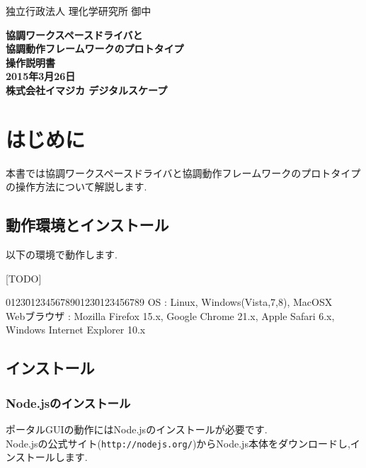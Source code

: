 \documentclass[a4paper,10pt,oneside]{jsbook}
\begin{document}
\begin{titlepage}
\noindent
独立行政法人 理化学研究所 御中
\begin{center}
	\vspace{8cm}
	{\Huge \textbf{協調ワークスペースドライバと}} \\
	\vspace{1cm}
	{\Huge \textbf{協調動作フレームワークのプロトタイプ}} \\
	\vspace{1cm}
	{\Huge \textbf{操作説明書}} \\
	\vspace{10cm}
	{\Large \textbf{2015年3月26日}} \\
	\vspace{0.5cm}
	{\Large \textbf{株式会社イマジカ デジタルスケープ}}
\end{center}
\end{titlepage}

\tableofcontents

\chapter{はじめに}
本書では協調ワークスペースドライバと協調動作フレームワークのプロトタイプの操作方法について解説します.

\section{動作環境とインストール}
以下の環境で動作します.

[TODO]

\begin{tabbing}
0123\=01234567890123\=0123456789\kill
\> OS \> : Linux, Windows(Vista,7,8), MacOSX \\
\> Webブラウザ \> : Mozilla Firefox 15.x, Google Chrome 21.x, Apple Safari 6.x, Windows Internet Explorer 10.x 
\end{tabbing}

\section{インストール}

\subsection{Node.jsのインストール}
ポータルGUIの動作にはNode.jsのインストールが必要です.\\
Node.jsの公式サイト(\verb+http://nodejs.org/+)からNode.js本体をダウンロードし,インストールします.
\end{document}
